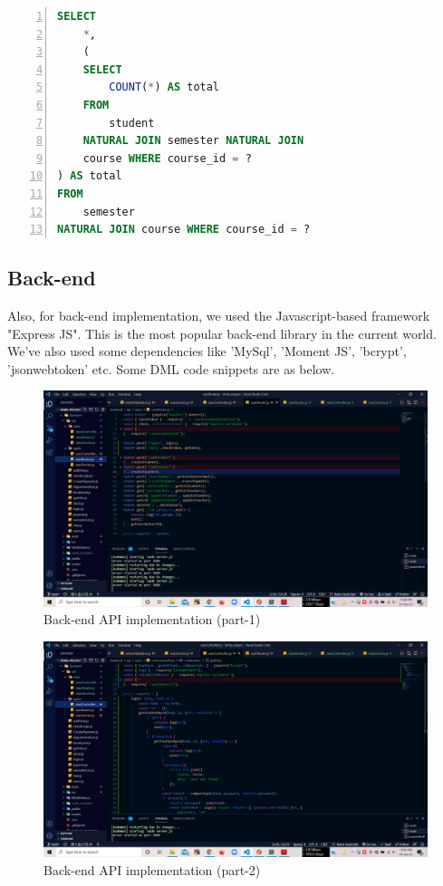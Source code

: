 \begin{lstlisting}[caption={A SQL query to find course data}, label=list:sql, captionpos=b,
           backgroundcolor=\color{white},
           language=SQL,
           breaklines=true,
           frame=single,
           showspaces=false,
           basicstyle=\ttfamily,
           numbers=left,
           numberstyle=\tiny,
           rulecolor=\color{red},
           keywordstyle=\color{blue},
           commentstyle=\color{gray}
        ]
SELECT
    *,
    (
    SELECT
        COUNT(*) AS total
    FROM
        student
    NATURAL JOIN semester NATURAL JOIN 
    course WHERE course_id = ?
) AS total
FROM
    semester
NATURAL JOIN course WHERE course_id = ?
\end{lstlisting}
\subsection{Back-end}\label{sub:backend}
Also, for back-end implementation, we used the Javascript-based framework "Express JS". This is the most popular back-end library in the current world. We've also used some dependencies like 'MySql', 'Moment JS', 'bcrypt', 'jsonwebtoken' etc. Some DML code snippets are as below.
\begin{figure}[H]
	\includegraphics[width=1\textwidth]{images/backend1}
	\caption{Back-end API implementation (part-1)}
\end{figure}
\begin{figure}[H]
	\includegraphics[width=1\textwidth]{images/backend2}
	\caption{Back-end API implementation (part-2)}
\end{figure}
\clearpage
